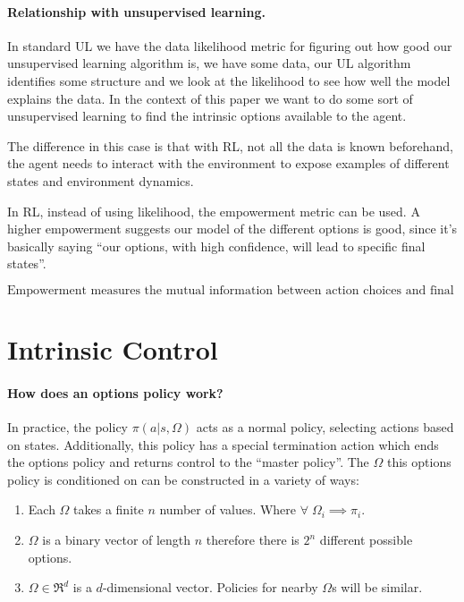 \documentclass{article}
\begin{document}
\paragraph{Relationship with unsupervised learning.} In standard UL we have the data likelihood metric for figuring out how good our unsupervised learning algorithm is, we have some data, our UL algorithm identifies some structure and we look at the likelihood to see how well the model explains the data. In the context of this paper we want to do some sort of unsupervised learning to find the intrinsic options available to the agent.


The difference in this case is that with RL, not all the data is known beforehand, the agent needs to interact with the environment to expose examples of different states and environment dynamics.


In RL, instead of using likelihood, the empowerment metric can be used. A higher empowerment suggests our model of the different options is good, since it's basically saying ``our options, with high confidence, will lead to specific final states''.

\begin{equation}
  \label{eq:2}
  \text{Empowerment measures the mutual information between action choices and final states}
\end{equation}

\section{Intrinsic Control}

\paragraph{How does an options policy work?} In practice, the policy \(\pi(a|s,\Omega)\) acts as a normal policy, selecting actions based on states. Additionally, this policy has a special termination action which ends the options policy and returns control to the ``master policy''. The \(\Omega\) this options policy is conditioned on can be constructed in a variety of ways:

\begin{enumerate}
  \item Each \(\Omega\) takes a finite \(n\) number of values. Where \(\forall \; \Omega_{i} \implies \pi_{i}\).
  \item \(\Omega\) is a binary vector of length \(n\) therefore there is \(2^{n}\) different possible options.
    \item \(\Omega \in \Re^{d}\) is a \(d\)-dimensional vector. Policies for nearby \(\Omega\)s will be similar.
\end{enumerate}
\end{document}
